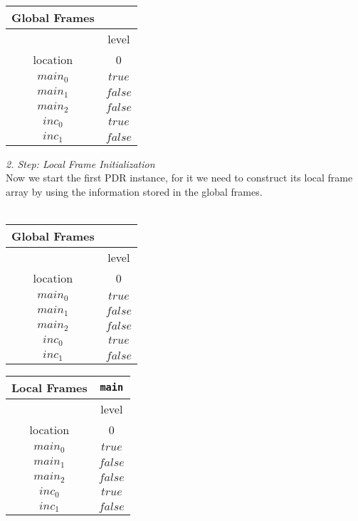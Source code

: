 \documentclass{article}
\begin{document}
	\setlength\tabcolsep{0.35em}
	\begin{center}
		\begin{tabu}{cc}
			Global Frames \\
			\toprule
			& level \\
			\cmidrule(lr){2-2}
			location & 0 \\
			$main_0$ & $true$ \\
			$main_1$ & $false$ \\
			$main_2$ & $false$ \\
			$inc_0$ & $true$ \\
			$inc_1$ & $false$\\
			\bottomrule
		\end{tabu}
	\end{center}
	
	\vspace*{1em}
	\textsl{2. Step: Local Frame Initialization} \\
	
	Now we start the first PDR instance, for it we need to construct its local frame array by using the information stored in the global frames. \\ \\
	\begin{minipage}{.5\textwidth}
		\setlength\tabcolsep{0.35em}
		\begin{center}
			\begin{tabu}{cc}
				Global Frames \\
				\toprule
				& level \\
				\cmidrule(lr){2-2}
				location & 0 \\
				\cmidrule{1-2}
				$main_0$ & $true$ \\
				$main_1$ & $false$ \\
				$main_2$ & $false$ \\
				$inc_0$ & $true$ \\
				$inc_1$ & $false$\\
				\bottomrule
			\end{tabu}
		\end{center}
	\end{minipage}
	\hfill
	\begin{minipage}{.4\textwidth}
	\setlength\tabcolsep{0.35em}
		\begin{center}
			\begin{tabu}{cc}
				Local Frames & \texttt{main} \\
				\toprule
				& level \\
				\cmidrule(lr){2-2}
				location & 0 \\
				$main_0$ & $true$ \\
				$main_1$ & $false$ \\
				$main_2$ & $false$ \\
				$inc_0$ & $true$ \\
				$inc_1$ & $false$\\
				\bottomrule
			\end{tabu}
		\end{center}	
	\end{minipage}
	
\end{document}
